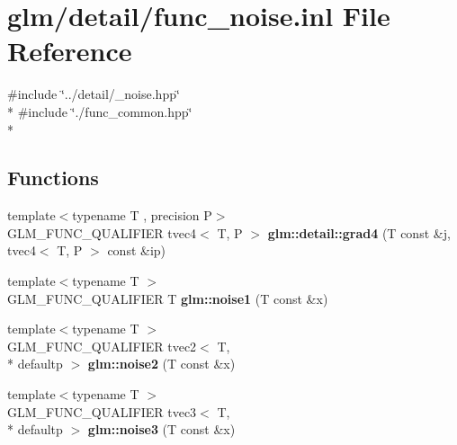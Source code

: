 \hypertarget{func__noise_8inl}{\section{glm/detail/func\-\_\-noise.inl File Reference}
\label{func__noise_8inl}
}
{\ttfamily \#include \char`\"{}../detail/\-\_\-noise.\-hpp\char`\"{}}\\*
{\ttfamily \#include \char`\"{}./func\-\_\-common.\-hpp\char`\"{}}\\*
\subsection*{Functions}
\begin{DoxyCompactItemize}
\item 
\hypertarget{namespaceglm_1_1detail_a629dfd7b07c1073a811f1e43d2b23b10}{{\footnotesize template$<$typename T , precision P$>$ }\\G\-L\-M\-\_\-\-F\-U\-N\-C\-\_\-\-Q\-U\-A\-L\-I\-F\-I\-E\-R tvec4$<$ T, P $>$ {\bfseries glm\-::detail\-::grad4} (T const \&j, tvec4$<$ T, P $>$ const \&ip)}\label{namespaceglm_1_1detail_a629dfd7b07c1073a811f1e43d2b23b10}

\item 
\hypertarget{namespaceglm_a46b13094895146ed855baa444f5b13a2}{{\footnotesize template$<$typename T $>$ }\\G\-L\-M\-\_\-\-F\-U\-N\-C\-\_\-\-Q\-U\-A\-L\-I\-F\-I\-E\-R T {\bfseries glm\-::noise1} (T const \&x)}\label{namespaceglm_a46b13094895146ed855baa444f5b13a2}

\item 
\hypertarget{namespaceglm_a3734b866749cfb832fd00c75c904385e}{{\footnotesize template$<$typename T $>$ }\\G\-L\-M\-\_\-\-F\-U\-N\-C\-\_\-\-Q\-U\-A\-L\-I\-F\-I\-E\-R tvec2$<$ T, \\*
defaultp $>$ {\bfseries glm\-::noise2} (T const \&x)}\label{namespaceglm_a3734b866749cfb832fd00c75c904385e}

\item 
\hypertarget{namespaceglm_ae94a3b00f396b4081493e38e5e389b9b}{{\footnotesize template$<$typename T $>$ }\\G\-L\-M\-\_\-\-F\-U\-N\-C\-\_\-\-Q\-U\-A\-L\-I\-F\-I\-E\-R tvec3$<$ T, \\*
defaultp $>$ {\bfseries glm\-::noise3} (T const \&x)}\label{namespaceglm_ae94a3b00f396b4081493e38e5e389b9b}


\end{DoxyCompactItemize}
